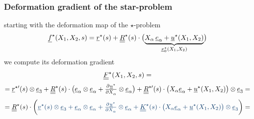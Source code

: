 \begin{frame}
  \frametitle{Deformation gradient of the star-problem}
  starting with the deformation map of the $\star$-problem
  \begin{displaymath}
    \underline{f}^{\star}(X_1,X_2,s) =
    \underline{r}^{\star}(s) + 
    \underline{\underline{R}}^{\star}(s) \cdot \bigl( \underbrace{ X_{\alpha} \, \underline{e}_{\alpha} + \underline{u}^{\star}(X_1,X_2) }_{\underline{x}_0^{\star}(X_1,X_2)} \bigr)
  \end{displaymath}
  we compute its deformation gradient
  \vspace{0.3em}
  \begin{displaymath}
    \underline{\underline{F}}^{\star}(X_1,X_2,s) =
  \end{displaymath}
  \begin{displaymath}
    = \underline{r}^{\star \prime}(s) \otimes \underline{e}_3 +
      \doubleunderline{R}^{\star}(s) \cdot \bigl( \underline{e}_{\alpha} \otimes \underline{e}_{\alpha} +
      \pd{\underline{u}^{\star}}{X_{\alpha}} \otimes \underline{e}_{\alpha} \bigr) +
      \doubleunderline{R}^{\star \prime}(s) \cdot \bigl( X_{\alpha} \underline{e}_{\alpha} + \underline{u}^{\star}(X_1,X_2) \bigr) \otimes \underline{e}_3 =
  \end{displaymath}
  \begin{displaymath}
    = \doubleunderline{R}^{\star}(s) \cdot \biggl( {\color{faublue}
        \underline{v}^{\star}(s) \otimes \underline{e}_3 +
        \underline{e}_{\alpha} \otimes \underline{e}_{\alpha} + 
        \pd{\underline{u}^{\star}}{X_{\alpha}} \otimes \underline{e}_{\alpha} +
        \doubleunderline{K}^{\star}(s) \cdot \bigl( X_{\alpha} \underline{e}_{\alpha} + \underline{u}^{\star}(X_1,X_2) \bigr) \otimes \underline{e}_3 }
      \biggr) =
  \end{displaymath}
  \begin{displaymath}

\end{displaymath}
\end{frame}
